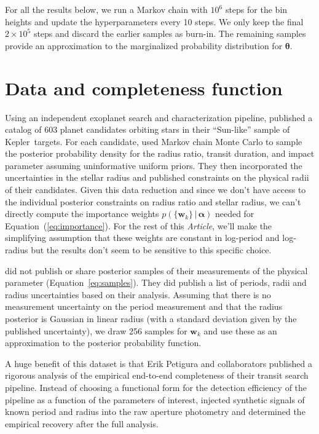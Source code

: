 \documentclass[12pt,preprint]{aastex}
\newcommand{\project}[1]{{\sffamily #1}}
\newcommand{\kepler}{\project{Kepler}}
\newcommand{\paper}{\textsl{Article}}
\newcommand{\Eq}[1]{Equation~(\ref{eq:#1})}
\newcommand{\eq}[1]{\Eq{#1}}
\newcommand{\eqalt}[1]{Equation~\ref{eq:#1}}
\newcommand{\sectlabel}[1]{\label{sect:#1}}
\newcommand{\bvec}[1]{\ensuremath{\boldsymbol{#1}}}
\newcommand{\ratepar}{{\ensuremath{\theta}}}
\newcommand{\ratepars}{{\ensuremath{\bvec{\ratepar}}}}
\newcommand{\entry}{{\ensuremath{\bvec{w}}}}
\newcommand{\interim}{{\ensuremath{\bvec{\alpha}}}}
\begin{document}
For all the results below, we run a Markov chain with $10^6$ steps for the bin
heights and update the hyperparameters every 10 steps.
We only keep the final $2 \times 10^5$ steps and discard the earlier samples
as burn-in.
The remaining samples provide an approximation to the marginalized probability
distribution for \ratepars.

\section{Data and completeness function}
\sectlabel{data}

Using an independent exoplanet search and characterization pipeline,
\citet{petigura} published a catalog of 603 planet candidates orbiting stars
in their ``Sun-like'' sample of \kepler\ targets.
For each candidate, \citet{petigura} used Markov chain Monte Carlo to sample
the posterior probability density for the radius ratio, transit duration, and
impact parameter assuming uninformative uniform priors.
They then incorporated the uncertainties in the stellar radius and published
constraints on the physical radii of their candidates.
Given this data reduction and since we don't have access to the individual
posterior constraints on radius ratio and stellar radius, we can't directly
compute the importance weights $p(\{\entry_k\}\,|\,\interim)$ needed for
\eq{importance}.
For the rest of this \paper, we'll make the simplifying assumption that these
weights are constant in log-period and log-radius but the results don't seem
to be sensitive to this specific choice.

\citet{petigura} did not publish or share posterior samples of their
measurements of the physical parameter (\eqalt{samples}).
They did publish a list of periods, radii and radius uncertainties based on
their analysis.
Assuming that there is no measurement uncertainty on the period measurement
and that the radius posterior is Gaussian in linear radius (with a standard
deviation given by the published uncertainty), we draw 256 samples for
$\entry_k$ and use these as an approximation to the posterior probability
function.

A huge benefit of this dataset is that Erik Petigura and collaborators
published a rigorous analysis of the empirical end-to-end completeness of
their transit search pipeline.
Instead of choosing a functional form for the detection efficiency of the
pipeline as a function of the parameters of interest, \citet{petigura}
injected synthetic signals of known period and radius into the raw aperture
photometry and determined the empirical recovery after the full analysis.
\end{document}
